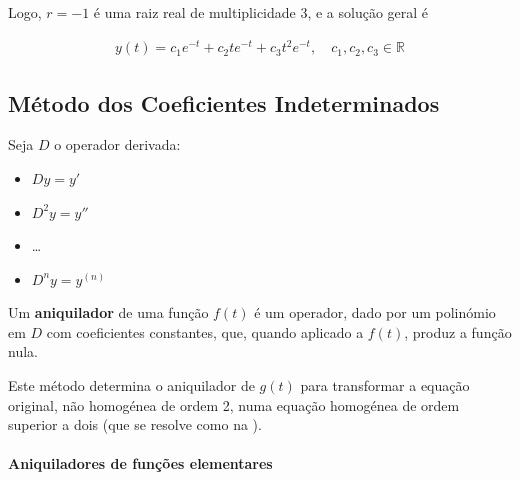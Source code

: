 \documentclass{article}
\begin{document}
Logo, $r = -1$ é uma raiz real de multiplicidade 3, e a solução geral é

\begin{gather*}
\boxed{y(t) = c_1 e^{-t} + c_2 t e^{-t} + c_3 t^2 e^{-t}, \quad c_1, c_2, c_3 \in \mathbb{R}}
\end{gather*}

\bigskip

\subsection{Método dos Coeficientes Indeterminados}
\label{subsec: metodo-coeficientes-indeterminados}

Seja $D$ o operador derivada:

\begin{itemize}
    \item $Dy = y'$
    \item $D^2 y = y''$
    \item \ldots
    \item $D^n y = y^{(n)}$
\end{itemize}

Um \textbf{aniquilador} de uma função $f(t)$ é um operador, dado por um polinómio em $D$ com coeficientes
constantes, que, quando aplicado a $f(t)$, produz a função nula.

\smallskip

Este método determina o aniquilador de $g(t)$ para transformar a equação original, não homogénea de
ordem 2, numa equação homogénea de ordem superior a dois (que se resolve como na
).

\paragraph{Aniquiladores de funções elementares}
\end{document}
